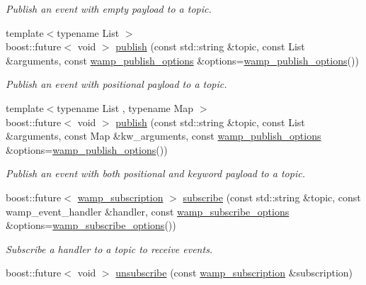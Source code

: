 \begin{DoxyCompactItemize}
\begin{DoxyCompactList}\small\item\em Publish an event with empty payload to a topic. \end{DoxyCompactList}\item 
{\footnotesize template$<$typename List $>$ }\\boost\+::future$<$ void $>$ \hyperlink{classautobahn_1_1wamp__session_a9ca2b82c99816275b2f13dff14facbb9}{publish} (const std\+::string \&topic, const List \&arguments, const \hyperlink{classautobahn_1_1wamp__publish__options}{wamp\+\_\+publish\+\_\+options} \&options=\hyperlink{classautobahn_1_1wamp__publish__options}{wamp\+\_\+publish\+\_\+options}())
\begin{DoxyCompactList}\small\item\em Publish an event with positional payload to a topic. \end{DoxyCompactList}\item 
{\footnotesize template$<$typename List , typename Map $>$ }\\boost\+::future$<$ void $>$ \hyperlink{classautobahn_1_1wamp__session_a7d40d4e66b27abc1459bdd3abc18e0bc}{publish} (const std\+::string \&topic, const List \&arguments, const Map \&kw\+\_\+arguments, const \hyperlink{classautobahn_1_1wamp__publish__options}{wamp\+\_\+publish\+\_\+options} \&options=\hyperlink{classautobahn_1_1wamp__publish__options}{wamp\+\_\+publish\+\_\+options}())
\begin{DoxyCompactList}\small\item\em Publish an event with both positional and keyword payload to a topic. \end{DoxyCompactList}\item 
boost\+::future$<$ \hyperlink{classautobahn_1_1wamp__subscription}{wamp\+\_\+subscription} $>$ \hyperlink{classautobahn_1_1wamp__session_a3979afb4fef6801d9fe12a9c09183b27}{subscribe} (const std\+::string \&topic, const wamp\+\_\+event\+\_\+handler \&handler, const \hyperlink{classautobahn_1_1wamp__subscribe__options}{wamp\+\_\+subscribe\+\_\+options} \&options=\hyperlink{classautobahn_1_1wamp__subscribe__options}{wamp\+\_\+subscribe\+\_\+options}())
\begin{DoxyCompactList}\small\item\em Subscribe a handler to a topic to receive events. \end{DoxyCompactList}\item 
boost\+::future$<$ void $>$ \hyperlink{classautobahn_1_1wamp__session_a3f83202670838318dbec10eb4ec622b5}{unsubscribe} (const \hyperlink{classautobahn_1_1wamp__subscription}{wamp\+\_\+subscription} \&subscription)

\end{DoxyCompactItemize}
